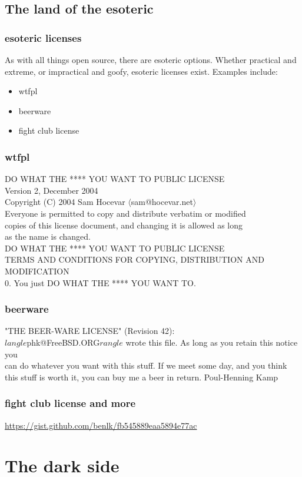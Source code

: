 \documentclass{beamer}
\begin{document}
	\subsection{The land of the esoteric}
	\begin{frame}
		\frametitle{esoteric licenses}
		As with all things open source, there are esoteric options. Whether practical and extreme, or impractical and goofy, esoteric licenses exist. Examples include:
		\pause
		\begin{itemize}[<+->]
			\item wtfpl
			\item beerware
			\item fight club license
		\end{itemize}
	\end{frame}
	\begin{frame}
		\frametitle{wtfpl}
		DO WHAT THE **** YOU WANT TO PUBLIC LICENSE\\
		Version 2, December 2004\\
		Copyright (C) 2004 Sam Hocevar $\langle$sam@hocevar.net$\rangle$\\
		Everyone is permitted to copy and distribute verbatim or modified\\
		copies of this license document, and changing it is allowed as long\\
		as the name is changed.\\
		DO WHAT THE **** YOU WANT TO PUBLIC LICENSE\\
		TERMS AND CONDITIONS FOR COPYING, DISTRIBUTION AND MODIFICATION\\
		0. You just DO WHAT THE **** YOU WANT TO.\\
	\end{frame}
	\begin{frame}
		\frametitle{beerware}
		"THE BEER-WARE LICENSE" (Revision 42):\\
		$langle$phk@FreeBSD.ORG$rangle$ wrote this file. As long as you retain this notice you\\
		can do whatever you want with this stuff. If we meet some day, and you think\\
		this stuff is worth it, you can buy me a beer in return.   Poul-Henning Kamp\\
	\end{frame}
	\begin{frame}
		\frametitle{fight club license and more}
		\center\url{https://gist.github.com/benlk/fb545889eaa5894e77ac}
	\end{frame}
	\section{The dark side}
\end{document}
